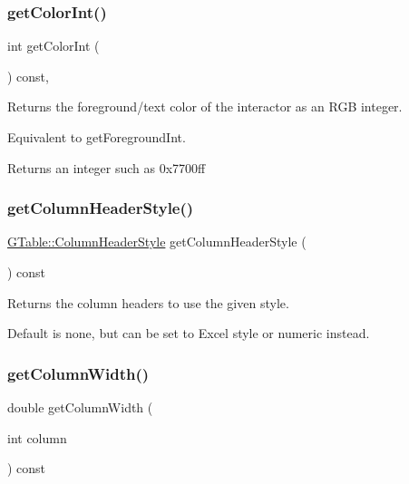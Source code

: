 \subsubsection{\texorpdfstring{get\+Color\+Int()}{getColorInt()}}
{\footnotesize\ttfamily int get\+Color\+Int (\begin{DoxyParamCaption}{ }\end{DoxyParamCaption}) const\hspace{0.3cm}{\ttfamily [virtual]}, {\ttfamily [inherited]}}



Returns the foreground/text color of the interactor as an R\+GB integer. 

Equivalent to get\+Foreground\+Int. \begin{DoxyReturn}{Returns}
an integer such as 0x7700ff 
\end{DoxyReturn}
\mbox{\label{classsgl_1_1GTable_a31ffc9e14dda3e91d1a1b3be81a42db8}} 
\subsubsection{\texorpdfstring{get\+Column\+Header\+Style()}{getColumnHeaderStyle()}}
{\footnotesize\ttfamily \mbox{\hyperlink{classsgl_1_1GTable_a060cff504451bbb98530e64e936e2671}{G\+Table\+::\+Column\+Header\+Style}} get\+Column\+Header\+Style (\begin{DoxyParamCaption}{ }\end{DoxyParamCaption}) const\hspace{0.3cm}{\ttfamily [virtual]}}



Returns the column headers to use the given style. 

Default is none, but can be set to Excel style or numeric instead. \mbox{\label{classsgl_1_1GTable_a4722043b7c3f968238968d3053b8a277}} 
\subsubsection{\texorpdfstring{get\+Column\+Width()}{getColumnWidth()}}
{\footnotesize\ttfamily double get\+Column\+Width (\begin{DoxyParamCaption}\item[{int}]{column }\end{DoxyParamCaption}) const\hspace{0.3cm}{\ttfamily [virtual]}}



